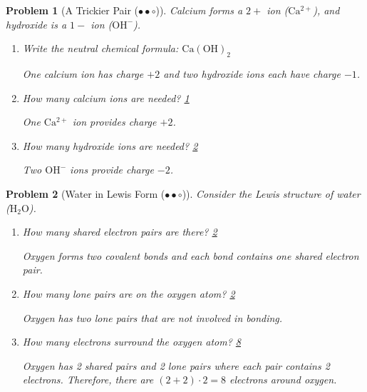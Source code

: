 \documentclass[a4paper,11pt]{article}
\newcommand{\medium}{(\ensuremath{\bullet \bullet \circ})}
\theoremstyle{listprobstyle}
\newtheorem{problem}{Problem}
\newenvironment{solution}
    {\par\begingroup\color{BrickRed}}
    {\par\endgroup}
\begin{document}
\begin{problem}[A Trickier Pair \medium]
Calcium forms a $2+$ ion ($\mathrm{Ca^{2+}}$), and hydroxide
is a $1-$ ion ($\mathrm{OH^-}$).
\vspace{-0.6\baselineskip}
\begin{enumerate}[label=\alph*),itemsep=0pt,parsep=0pt,topsep=0pt]
\item Write the neutral chemical formula:
    \underline{\textcolor{BrickRed}{$\mathrm{Ca(OH)_2}$}}
    \begin{solution}
    One calcium ion has charge $+2$ and two hydroxide ions each have
    charge $-1$.
    \end{solution}
\vspace{0.5\baselineskip}
\item How many calcium ions are needed?
    \underline{\textcolor{BrickRed}{1}}
    \begin{solution}
    One $\mathrm{Ca^{2+}}$ ion provides charge $+2$.
    \end{solution}
\vspace{0.5\baselineskip}
\item How many hydroxide ions are needed?
    \underline{\textcolor{BrickRed}{2}}
    \begin{solution}
    Two $\mathrm{OH^-}$ ions provide charge $-2$.
    \end{solution}
\end{enumerate}
\end{problem}


\begin{problem}[Water in Lewis Form \medium]
Consider the Lewis structure of water ($\mathrm{H_2O}$).
\vspace{-0.6\baselineskip}
\begin{enumerate}[label=\alph*),itemsep=0pt,parsep=0pt,topsep=0pt]
\item How many shared electron pairs are there?
    \underline{\textcolor{BrickRed}{\phantom{X}2\phantom{X}}}
    \begin{solution}
    Oxygen forms two covalent bonds and each bond contains one shared
    electron pair.
    \end{solution}
\vspace{0.5\baselineskip}
\item How many lone pairs are on the oxygen atom?
    \underline{\textcolor{BrickRed}{\phantom{X}2\phantom{X}}}
    \begin{solution}
    Oxygen has two lone pairs that are not involved in bonding.
    \end{solution}
\vspace{0.5\baselineskip}
\item How many electrons surround the oxygen atom?
    \underline{\textcolor{BrickRed}{\phantom{X}8\phantom{X}}}
    \begin{solution}
    Oxygen has 2 shared pairs and 2 lone pairs where each pair contains
    2 electrons. Therefore, there are $(2 + 2) \cdot 2 = 8$ electrons
    around oxygen.
    \end{solution}
\end{enumerate}
\end{problem}
\end{document}
